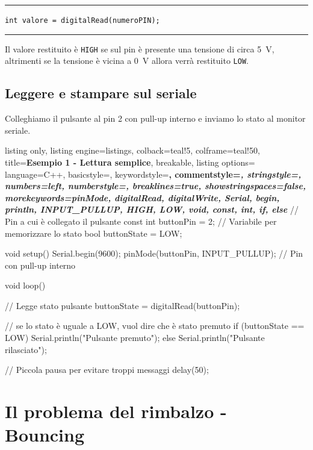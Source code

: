 \begin{center}
    \hrule
    \vspace{0.2cm}
    \texttt{int valore = digitalRead(numeroPIN);}
    \vspace{0.2cm}
    \hrule
\end{center}

Il valore restituito è \texttt{HIGH} se sul pin è presente una tensione di circa \SI{5}{\volt}, altrimenti se la tensione è vicina a \SI{0}{\volt} allora verrà restituito \texttt{LOW}.

\subsection*{Leggere e stampare sul seriale}

Colleghiamo il pulsante al pin 2 con pull-up interno e inviamo lo stato al monitor seriale.

\begin{tcblisting}{
    listing only,
    listing engine=listings,
    colback=teal!5,
    colframe=teal!50,
    title=\textbf{Esempio 1 - Lettura semplice},
    breakable,
    listing options={
        language=C++,
        basicstyle=\ttfamily\small,
        keywordstyle=\color{blue!80!black}\bfseries,
        commentstyle=\color{green!50!black}\itshape,
        stringstyle=\color{orange!80!black},
        numbers=left,
        numberstyle=\tiny\color{gray},
        breaklines=true,
        showstringspaces=false,
        morekeywords={pinMode, digitalRead, digitalWrite, Serial, begin, println, INPUT\_PULLUP, HIGH, LOW, void, const, int, if, else}
    }
}
// Pin a cui è collegato il pulsante
const int buttonPin = 2;
// Variabile per memorizzare lo stato   
bool buttonState = LOW;    

void setup() {
    Serial.begin(9600);                
    pinMode(buttonPin, INPUT_PULLUP);  // Pin con pull-up interno
}

void loop() {
    // Legge stato pulsante
    buttonState = digitalRead(buttonPin);

    // se lo stato è uguale a LOW, vuol dire che è stato premuto
    if (buttonState == LOW) {              
        Serial.println("Pulsante premuto");
    } else {
        Serial.println("Pulsante rilasciato");
    }

    // Piccola pausa per evitare troppi messaggi
    delay(50);
}
\end{tcblisting}

\section{Il problema del rimbalzo - Bouncing}

